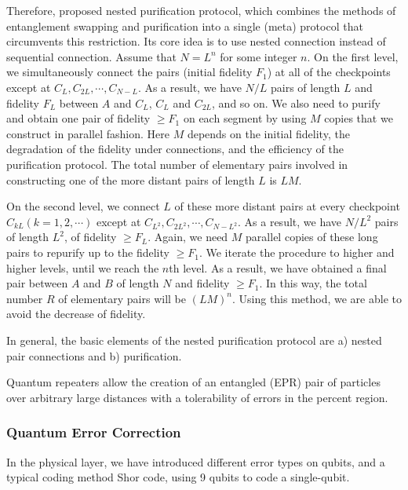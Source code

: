 \documentclass[10pt]{article}
\begin{document}
Therefore, \cite{briegel1998quantum} proposed nested purification protocol, which combines
the methods of entanglement swapping and purification into a single (meta) protocol that circumvents this restriction. Its core idea is to use nested connection instead of sequential connection.
Assume that $N = L^n$ for some integer $n$. On the first level, we simultaneously connect the pairs (initial fidelity $F_1$) at all of the checkpoints except at $C_L,C_{2L},\cdots,C_{N-L}$. As a result, we have $N/L$ pairs of length $L$ and fidelity $F_L$ between $A$ and $C_L$, $C_L$ and $C_{2L}$, and so on. We also need to purify and obtain one pair of fidelity $\geq F_1$ on each segment by using $M$ copies that we construct in parallel fashion. Here $M$ depends on the initial fidelity, the degradation of the fidelity under connections, and the efficiency of the purification protocol. The total number of elementary pairs involved in constructing one of the more distant pairs of length $L$ is $LM$. 

On the second level, we connect $L$ of these more distant pairs at every checkpoint $C_{kL}(k = 1, 2, \cdots)$ except at $C_{L^2},C_{2L^2},\cdots,C_{N-L^2}$. As a result, we have $N/L^2$ pairs of length $L^2$, of fidelity $\geq F_L$. Again, we need $M$ parallel copies of these long pairs to repurify up to the fidelity $\geq F_1$. We iterate the procedure to higher and higher levels, until we reach the $n$th level. As a result, we have obtained a final pair between $A$ and $B$ of length $N$ and fidelity $\geq F_1$. In this way, the
total number $R$ of elementary pairs will be $(LM)^n$. Using this method, we are able to avoid the decrease of fidelity.


In general, the basic elements of the nested purification protocol are a) nested pair connections and b) purification. 

Quantum repeaters allow the creation of an entangled (EPR) pair of particles over arbitrary large distances with a tolerability of errors in the percent region. 

\subsubsection{Quantum Error Correction}
In the physical layer, we have introduced different error types on qubits, and a typical coding method Shor code, using 9 qubits to code a single-qubit. 
\end{document}
